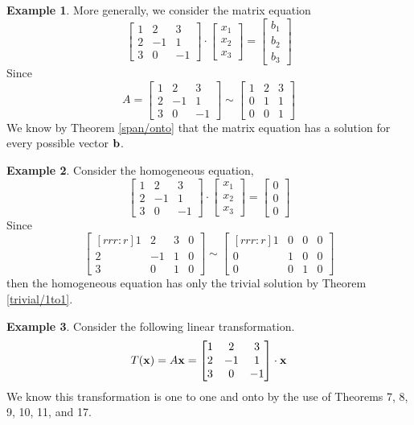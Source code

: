 \documentclass[12pt,letterpaper]{article}
\newcommand{\x}{{\bf x}}
\renewcommand{\b}{{\bf b}}
\newcommand{\0}{{\bf 0}}
\theoremstyle{plain}
\theoremstyle{definition}
\newtheorem{example}{Example}
\begin{document}
\begin{example}
More generally, we consider the matrix equation
\[
\begin{bmatrix}
1& 2 & 3 \\
2& -1 & 1\\
3 & 0 & -1
\end{bmatrix}\cdot\begin{bmatrix}x_1\\x_2\\x_3\end{bmatrix}=\begin{bmatrix}b_1\\b_2\\b_3\end{bmatrix}
\]
Since 
\[A=\begin{bmatrix}
1& 2 & 3 \\
2& -1 & 1\\
3 & 0 & -1
\end{bmatrix}\sim \begin{bmatrix}
1& 2 & 3 \\
0 & 1 & 1\\
0 & 0 & 1
\end{bmatrix}
\]
We know by Theorem \ref{span/onto} that the matrix equation has a solution for every possible vector $\b$. 
\end{example}
\begin{example}
Consider the homogeneous equation, 
\[
\begin{bmatrix}
1& 2 & 3 \\
2& -1 & 1\\
3 & 0 & -1
\end{bmatrix}\cdot\begin{bmatrix}x_1\\x_2\\x_3\end{bmatrix}=\begin{bmatrix}0\\0\\0\end{bmatrix}
\]
Since 
\[\begin{bmatrix}[rrr:r]
1& 2 & 3 &0\\
2& -1& 1&0\\
3 & 0 & 1 &0
\end{bmatrix}\sim
\begin{bmatrix}[rrr:r]
1& 0 & 0 &0\\
0& 1& 0&0\\
0 & 0 & 1 &0
\end{bmatrix}
\]
then the homogeneous equation has only the trivial solution by Theorem \ref{trivial/1to1}. 
\end{example}


\begin{example}
Consider the following linear transformation. 
\[T(\x)=A\x=\begin{bmatrix}
1& 2 & 3 \\
2& -1 & 1\\
3 & 0 & -1
\end{bmatrix}\cdot\x\]
We know this transformation is one to one and onto by the use of Theorems 7, 8, 9, 10, 11, and 17.
\end{example}
\end{document}
